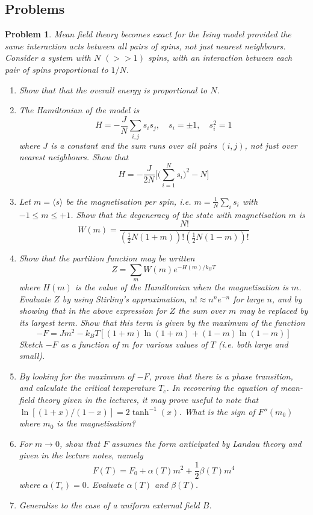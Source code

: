 \documentclass[a4paper]{article}
\theoremstyle{new}
\newtheorem{qns}{Problem}[section]
\begin{document}
\subsection{Problems}
\begin{qns}
Mean field theory becomes exact for the Ising model provided the same interaction acts between all pairs of spins, not just nearest neighbours. Consider a system with $N$ $(>>1)$ spins, with an interaction between each pair of spins proportional to $1/N$.
\begin{enumerate}[label=(\alph*)]
\item  Show that that the overall energy is proportional to $N$.
\item The Hamiltonian of the model is 
$$H=-\frac{J}{N}\sum_{i,j}s_is_j,\quad s_i=\pm1,\quad s_i^2=1$$
where $J$ is a constant and the sum runs over all pairs $(i, j)$, not just over nearest neighbours. Show that 
$$H=-\frac{J}{2N}\bigg[\bigg(\sum_{i=1}^Ns_i\bigg)^2-N\bigg]$$
\item Let $m=\langle s\rangle$ be the magnetisation per spin, i.e. $m=\frac{1}{N}\sum_i s_i$ with $−1\leq m\leq +1$. Show that the degeneracy of the state with magnetisation $m$ is
$$W(m)=\frac{N!}{(\frac{1}{2}N(1+m))!(\frac{1}{2}N(1-m))!}$$
\item Show that the partition function may be written
$$Z=\sum_mW(m)e^{-H(m)/k_BT}$$
where $H(m)$ is the value of the Hamiltonian when the magnetisation is $m$. Evaluate $Z$ by using Stirling’s approximation, $n!\approx n^ne^{-n}$ for large $n$, and by showing that in the above expression for $Z$ the sum over $m$ may be replaced by its largest term. Show that this term is given by the maximum of the function
$$-F=Jm^2-k_BT[(1+m)\ln(1+m)+(1-m)\ln(1-m)]$$
Sketch $−F$ as a function of $m$ for various values of $T$ (i.e. both large and small).
\item By looking for the maximum of $−F$, prove that there is a phase transition, and calculate the critical temperature $T_c$. In recovering the equation of mean-field theory given in the lectures, it may prove useful to note that $\ln[(1+x)/(1−x)] = 2\tanh^{-1}(x)$. What is the sign of $F''(m_0)$ where $m_0$ is the magnetisation?
\item For $m\rightarrow 0$, show that $F$ assumes the form anticipated by Landau theory and given in the lecture notes, namely
$$F(T)=F_0+\alpha(T)m^2+\frac{1}{2}\beta(T)m^4$$
where $\alpha(T_c)=0$. Evaluate $\alpha(T)$ and $\beta(T)$.
\item Generalise to the case of a uniform external field $B$.
\end{enumerate}
\end{qns}
\end{document}
